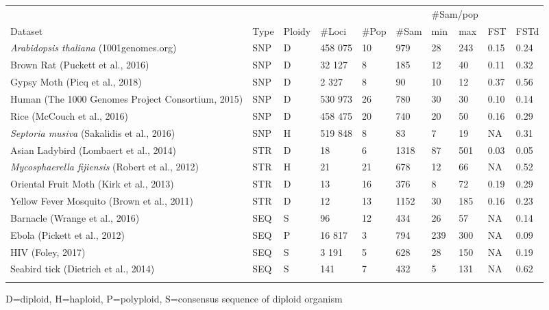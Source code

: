 \documentclass[final]{bioinfo}
\begin{document}
\begin{table}[!tbp]
{\centering\begin{tabular}{@{}llllllllll@{}}
\toprule
 & & & & & & \multicolumn{2}{c}{\#Sam/pop} & &\\ 
\cline{7-8}
Dataset & Type & Ploidy & \#Loci & \#Pop & \#Sam & min & max & FST & FSTd\\
\midrule
\textit{Arabidopsis thaliana} (1001genomes.org) & SNP & D & 458 075 & 10 & 979 & 28 & 243 & 0.15 & 0.24\\
Brown Rat (Puckett et al., 2016) & SNP & D & 32 127 & 8 & 185 & 12 & 40 & 0.11 & 0.32\\
Gypsy Moth (Picq et al., 2018) & SNP & D & 2 327 & 8 & 90 & 10 & 12 & 0.37 & 0.56\\
Human (The 1000 Genomes Project Consortium, 2015) & SNP & D & 530 973 & 26 & 780 & 30 & 30 & 0.10 & 0.14\\
Rice (McCouch et al., 2016) & SNP & D & 458 475 & 20 & 740 & 20 & 50 & 0.16 & 0.29\\
\textit{Septoria musiva }(Sakalidis et al., 2016) & SNP & H & 519 848 & 8 & 83 & 7 & 19 & NA & 0.31\\
Asian Ladybird (Lombaert et al., 2014) & STR & D & 18 & 6 & 1318 & 87 & 501 & 0.03 & 0.05\\
\textit{Mycosphaerella fijiensis} (Robert et al., 2012) & STR & H & 21 & 21 & 678 & 12 & 66 & NA & 0.52\\
Oriental Fruit Moth (Kirk et al., 2013) & STR & D & 13 & 16 & 376 & 8 & 72 & 0.19 & 0.29\\
Yellow Fever Mosquito (Brown et al., 2011) & STR & D & 12 & 13 & 1152 & 30 & 185 & 0.16 & 0.23\\
Barnacle (Wrange et al., 2016) & SEQ & S & 96 & 12 & 434 & 26 & 57 & NA & 0.14\\
Ebola (Pickett et al., 2012) & SEQ & P & 16 817 & 3 & 794 & 239 & 300 & NA & 0.09\\
HIV (Foley, 2017) & SEQ & S & 3 191 & 5 & 628 & 28 & 150 & NA & 0.19\\
Seabird tick (Dietrich et al., 2014) & SEQ & S & 141 & 7 & 432 & 5 & 131 & NA & 0.62\\
\botrule
\end{tabular}}{D=diploid, H=haploid, P=polyploid, S=consensus sequence of diploid organism}
\end{table}
\end{document}
